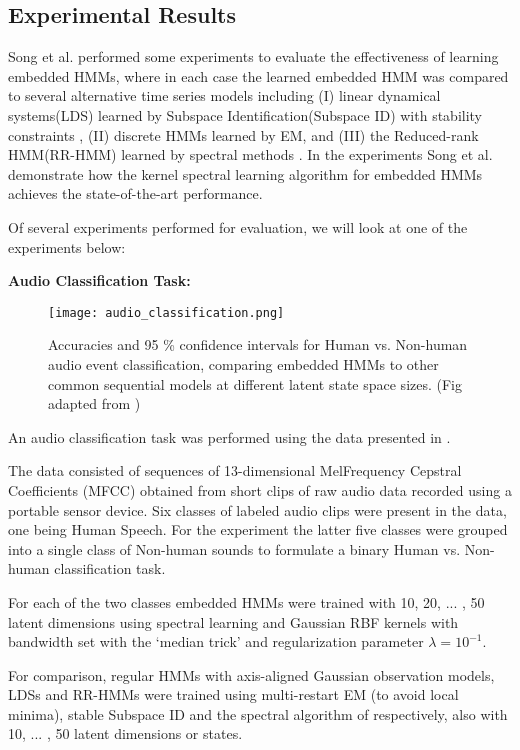 
\subsection{Experimental Results}
Song et al.\cite{ref20} performed some experiments to evaluate the effectiveness
of learning embedded HMMs, where in each case the learned embedded HMM was compared to several alternative
time series models including (I) linear dynamical
systems(LDS) learned by Subspace Identification(Subspace ID)\cite{ref13} with
stability constraints \cite{ref25}, (II) discrete
HMMs learned by EM, and (III) the Reduced-rank
HMM(RR-HMM) learned by spectral methods \cite{ref7}. In the experiments Song et al.\cite{ref20} demonstrate how
the kernel spectral learning algorithm for embedded
HMMs achieves the state-of-the-art performance.

Of several experiments performed for evaluation, we will look at one of the experiments below:

\textbf{Audio Classification Task:}

\begin{figure}[h]
    \centering
    \texttt{[image: audio\_classification.png]}  
    \caption{Accuracies and 95 \% confidence intervals for Human
vs. Non-human audio event classification, comparing
embedded HMMs to other common sequential models at
different latent state space sizes. (Fig adapted from \cite{ref20})}
    \label{fig:audio}
\end{figure}

An audio classification
task was performed using the data presented in \cite{ref26}.

The data consisted of sequences of 13-dimensional MelFrequency Cepstral Coefficients (MFCC) obtained
from short clips of raw audio data recorded using
a portable sensor device. Six classes of labeled audio
clips were present in the data, one being Human
Speech. 
For the experiment the latter five
classes were grouped into a single class of Non-human sounds to formulate a binary Human vs. Non-human classification
task. 

For each of the two classes embedded
HMMs were trained with 10, 20, ... , 50 latent dimensions using spectral learning and Gaussian RBF kernels with
bandwidth set with the ‘median trick’ and regularization
parameter $ \lambda = {10}^{-1}$.

For comparison, regular HMMs with
axis-aligned Gaussian observation models, LDSs and
RR-HMMs were trained using multi-restart EM (to
avoid local minima), stable Subspace ID and the spectral
algorithm of \cite{ref7} respectively, also
with 10, ... , 50 latent dimensions or states.

